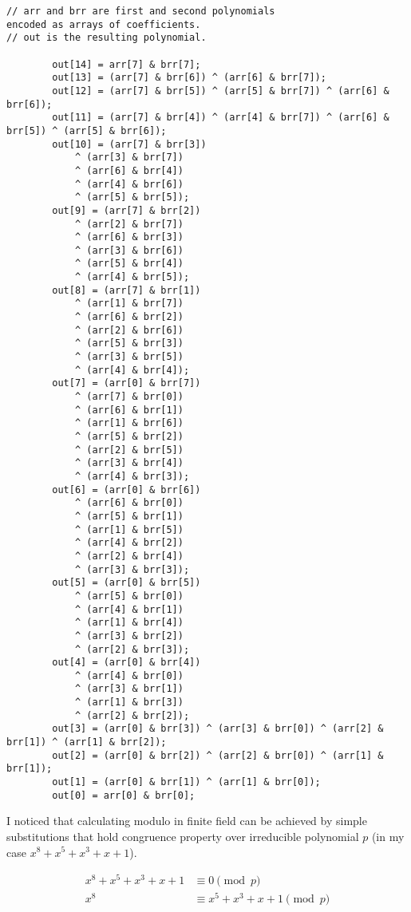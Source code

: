 \documentclass[runningheads,a4paper]{llncs}
\begin{document}
\begin{lstlisting}
// arr and brr are first and second polynomials
encoded as arrays of coefficients.
// out is the resulting polynomial.

        out[14] = arr[7] & brr[7];
        out[13] = (arr[7] & brr[6]) ^ (arr[6] & brr[7]);
        out[12] = (arr[7] & brr[5]) ^ (arr[5] & brr[7]) ^ (arr[6] & brr[6]);
        out[11] = (arr[7] & brr[4]) ^ (arr[4] & brr[7]) ^ (arr[6] & brr[5]) ^ (arr[5] & brr[6]);
        out[10] = (arr[7] & brr[3])
            ^ (arr[3] & brr[7])
            ^ (arr[6] & brr[4])
            ^ (arr[4] & brr[6])
            ^ (arr[5] & brr[5]);
        out[9] = (arr[7] & brr[2])
            ^ (arr[2] & brr[7])
            ^ (arr[6] & brr[3])
            ^ (arr[3] & brr[6])
            ^ (arr[5] & brr[4])
            ^ (arr[4] & brr[5]);
        out[8] = (arr[7] & brr[1])
            ^ (arr[1] & brr[7])
            ^ (arr[6] & brr[2])
            ^ (arr[2] & brr[6])
            ^ (arr[5] & brr[3])
            ^ (arr[3] & brr[5])
            ^ (arr[4] & brr[4]);
        out[7] = (arr[0] & brr[7])
            ^ (arr[7] & brr[0])
            ^ (arr[6] & brr[1])
            ^ (arr[1] & brr[6])
            ^ (arr[5] & brr[2])
            ^ (arr[2] & brr[5])
            ^ (arr[3] & brr[4])
            ^ (arr[4] & brr[3]);
        out[6] = (arr[0] & brr[6])
            ^ (arr[6] & brr[0])
            ^ (arr[5] & brr[1])
            ^ (arr[1] & brr[5])
            ^ (arr[4] & brr[2])
            ^ (arr[2] & brr[4])
            ^ (arr[3] & brr[3]);
        out[5] = (arr[0] & brr[5])
            ^ (arr[5] & brr[0])
            ^ (arr[4] & brr[1])
            ^ (arr[1] & brr[4])
            ^ (arr[3] & brr[2])
            ^ (arr[2] & brr[3]);
        out[4] = (arr[0] & brr[4])
            ^ (arr[4] & brr[0])
            ^ (arr[3] & brr[1])
            ^ (arr[1] & brr[3])
            ^ (arr[2] & brr[2]);
        out[3] = (arr[0] & brr[3]) ^ (arr[3] & brr[0]) ^ (arr[2] & brr[1]) ^ (arr[1] & brr[2]);
        out[2] = (arr[0] & brr[2]) ^ (arr[2] & brr[0]) ^ (arr[1] & brr[1]);
        out[1] = (arr[0] & brr[1]) ^ (arr[1] & brr[0]);
        out[0] = arr[0] & brr[0];
\end{lstlisting}

I noticed that calculating modulo in finite field can be achieved by simple substitutions that hold congruence property over irreducible polynomial $p$ (in my case $x^8 + x^5 + x^3 + x + 1$).

\begin{align*} 
x^8 + x^5 + x^3 + x + 1 &\equiv 0 \pmod{p}\\
x^8 &\equiv x^5 + x^3 + x + 1 \pmod{p}
\end{align*} 
\end{document}
